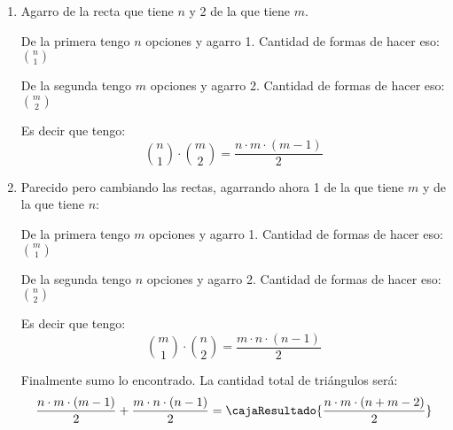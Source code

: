 \begin{enumerate}[label=(\Roman*)]
  \item
        Agarro  de la recta que tiene $n$ y {\color{red!80!black}2} de la que tiene $m$.
        \begin{center}
          De la primera tengo $n$ opciones y agarro 1. Cantidad de formas de hacer eso: $\binom{n}{1}$

          De la segunda tengo $m$ opciones y agarro 2. Cantidad de formas de hacer eso: $\binom{m}{2}$
        \end{center}

        Es decir que tengo:
        $$
          \binom{n}{1}
          \cdot
          \binom{m}{2}
          = \frac{n \cdot m \cdot (m - 1)}{2}
        $$

  \item
        Parecido pero cambiando las rectas, agarrando ahora {\color{red!80!black}1} de la que tiene $m$ y
         de la que tiene $n$:
        \begin{center}
          De la primera tengo $m$ opciones y agarro 1. Cantidad de formas de hacer eso: $\binom{m}{1}$

          De la segunda tengo $n$ opciones y agarro 2. Cantidad de formas de hacer eso: $\binom{n}{2}$
        \end{center}

        Es decir que tengo:
        $$
          \binom{m}{1}
          \cdot
          \binom{n}{2}
          = \frac{m \cdot n \cdot (n - 1)}{2}
        $$

        \bigskip

        Finalmente sumo lo encontrado. La cantidad total de triángulos será:
        $$
          \frac{n \cdot m \cdot (m - 1)}{2}
          +
          \frac{m \cdot n \cdot (n - 1)}{2}
          =
          \cajaResultado{
            \frac{n \cdot m \cdot (n + m - 2)}{2}
          }
        $$
\end{enumerate}

\begin{aportes}
  \item {}
  \item {}
\end{aportes}
